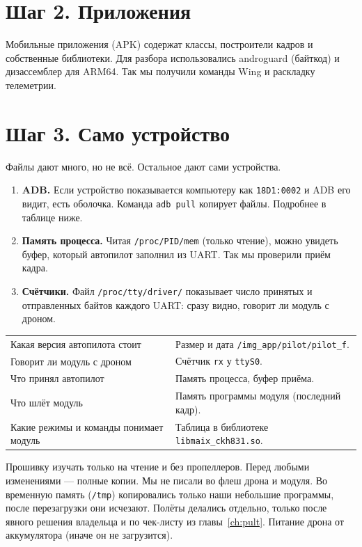 \section{Шаг 2. Приложения}

Мобильные приложения (APK) содержат классы, построители кадров и собственные библиотеки. Для разбора использовались androguard (байткод) и дизассемблер для ARM64. Так мы получили команды Wing и раскладку телеметрии. \pr{}

\section{Шаг 3. Само устройство}

Файлы дают много, но не всё. Остальное дают сами устройства.

\begin{enumerate}
  \item \textbf{ADB.} Если устройство показывается компьютеру как \texttt{18D1:0002} и ADB его видит, есть оболочка. Команда \texttt{adb pull} копирует файлы. Подробнее в таблице ниже.
  \item \textbf{Память процесса.} Читая \texttt{/proc/PID/mem} (только чтение), можно увидеть буфер, который автопилот заполнил из UART. Так мы проверили приём кадра.
  \item \textbf{Счётчики.} Файл \texttt{/proc/tty/driver/} показывает число принятых и отправленных байтов каждого UART: сразу видно, говорит ли модуль с дроном.
\end{enumerate}

\begin{tabularx}{\textwidth}{@{}p{5.4cm} Y@{}}
\toprule
{} &  \\ \midrule
Какая версия автопилота стоит & Размер и дата \texttt{/img\_app/pilot/pilot\_f}. \\
Говорит ли модуль с дроном & Счётчик \texttt{rx} у \texttt{ttyS0}. \\
Что принял автопилот & Память процесса, буфер приёма. \\
Что шлёт модуль & Память программы модуля (последний кадр). \\
Какие режимы и команды понимает модуль & Таблица в библиотеке \texttt{libmaix\_ckh831.so}. \\ \bottomrule
\end{tabularx}

\begin{opasno}
Прошивку изучать только на чтение и без пропеллеров. Перед любыми изменениями --- полные копии. Мы не писали во флеш дрона и модуля. Во временную память (\texttt{/tmp}) копировались только наши небольшие программы, после перезагрузки они исчезают. Полёты делались отдельно, только после явного решения владельца и по чек-листу из главы~\ref{ch:pult}. Питание дрона от аккумулятора (иначе он не загрузится). \pr{}
\end{opasno}

